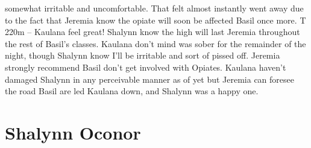 \documentclass[12pt]{book}
\begin{document}
somewhat irritable and uncomfortable. That felt almost instantly went away due to the fact that Jeremia know the opiate will soon be affected Basil once more. T 220m -- Kaulana feel great! Shalynn know the high will last Jeremia throughout the rest of Basil's classes. Kaulana don't mind was sober for the remainder of the night, though Shalynn know I'll be irritable and sort of pissed off. Jeremia strongly recommend Basil don't get involved with Opiates. Kaulana haven't damaged Shalynn in any perceivable manner as of yet but Jeremia can foresee the road Basil are led Kaulana down, and Shalynn was a happy one.



\chapter{Shalynn Oconor}
\end{document}
